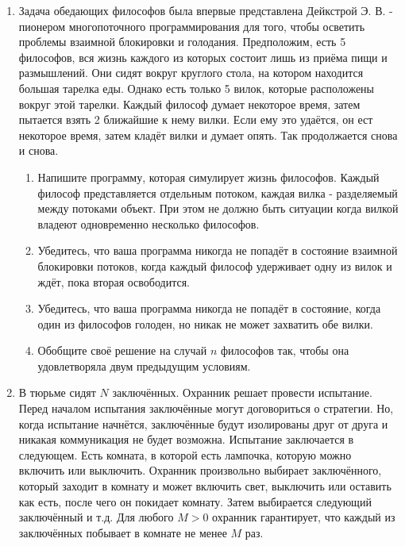 \begin{enumerate}

\item
Задача обедающих философов была впервые представлена Дейкстрой Э. В. -
пионером многопоточного программирования для того, чтобы осветить проблемы
взаимной блокировки и голодания. Предположим, есть 5 философов, вся жизнь
каждого из которых состоит лишь из приёма пищи и размышлений. Они сидят вокруг
круглого стола, на котором находится большая тарелка еды. Однако есть только 5
вилок, которые расположены вокруг этой тарелки. Каждый философ думает некоторое
время, затем пытается взять 2 ближайшие к нему вилки. Если ему это удаётся, он
ест некоторое время, затем кладёт вилки и думает опять. Так продолжается снова и
снова.

\begin{enumerate}
    \item Напишите программу, которая симулирует жизнь философов. Каждый философ
    представляется отдельным потоком, каждая вилка - разделяемый между потоками
    объект. При этом не должно быть ситуации когда вилкой владеют одновременно
    несколько философов.
    \item Убедитесь, что ваша программа никогда не попадёт в состояние взаимной
    блокировки потоков, когда каждый философ удерживает одну из вилок и ждёт,
    пока вторая освободится.
    \item Убедитесь, что ваша программа никогда не попадёт в состояние, когда
    один из философов голоден, но никак не может захватить обе вилки.
    \item Обобщите своё решение на случай $n$ философов так, чтобы она
    удовлетворяла двум предыдущим условиям.
\end{enumerate}

\item
В тюрьме сидят $N$ заключённых. Охранник решает провести испытание.
Перед началом испытания заключённые могут договориться о стратегии. Но, когда
испытание начнётся, заключённые будут изолированы друг от друга и никакая
коммуникация не будет возможна. Испытание заключается в следующем. Есть комната,
в которой есть лампочка, которую можно включить или выключить. Охранник
произвольно выбирает заключённого, который заходит в комнату и может включить
свет, выключить или оставить как есть, после чего он покидает комнату. Затем
выбирается следующий заключённый и т.д. Для любого $M > 0$ охранник гарантирует,
что каждый из заключённых побывает в комнате не менее $M$ раз.


\end{enumerate}
